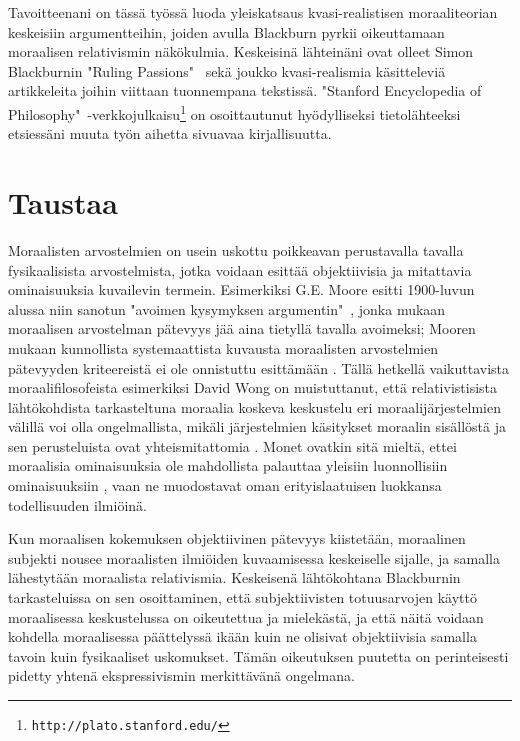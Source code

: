 \documentclass[a4paper,12pt,times,titlepage,finnish]{article}
\begin{document}
Tavoitteenani on tässä työssä luoda yleiskatsaus kvasi-\-realistisen moraaliteorian keskeisiin argumentteihin, joiden avulla Blackburn pyrkii oikeuttamaan moraalisen relativismin näkökulmia. Keskeisinä lähteinäni ovat olleet Simon Blackburnin "Ruling Passions"\  \citep{Blackburn98} sekä joukko kvasi-\-rea\-lis\-mia kä\-sit\-te\-leviä artikkeleita joihin viittaan tuonnempana tekstissä. "Stanford Encyclopedia of Philosophy"\ -verkkojulkaisu\footnote{\texttt{http://plato.stanford.edu/}} on osoittautunut hyödylliseksi tie\-to\-läh\-teek\-si etsiessäni muuta työn aihetta sivuavaa kirjallisuutta.


\section{Taustaa}

Moraalisten arvostelmien on usein uskottu poikkeavan perustavalla tavalla fysikaalisista arvostelmista, jotka voidaan esittää objektiivisia ja mitattavia ominaisuuksia kuvailevin termein. Esimerkiksi G.E. Moore esitti 1900-luvun alussa niin sanotun "avoimen kysymyksen argumentin"\ \citep[15]{Moore03}, jonka mukaan moraalisen arvostelman pätevyys jää aina tietyllä tavalla avoimeksi; Mooren mukaan kunnollista systemaattista kuvausta moraalisten arvostelmien pätevyyden kriteereistä ei ole onnistuttu esittämään \citep[luku 2]{NonNaturalism08}. Tällä hetkellä vaikuttavista moraalifilosofeista esimerkiksi David Wong on muistuttanut, että relativistisista läh\-tö\-koh\-dis\-ta tarkasteltuna moraalia koskeva keskustelu eri moraalijärjestelmien välillä voi olla ongelmallista, mikäli järjestelmien käsitykset moraalin sisällöstä ja sen perusteluista ovat yhteismitattomia \citep[ks. esim.][luku 1]{Wong84}. Monet ovatkin sitä mieltä, ettei moraalisia ominaisuuksia ole mahdollista palauttaa yleisiin luonnollisiin ominaisuuksiin \citep[kappale 3.1]{cognitivismSE}, vaan ne muodostavat oman erityislaatuisen luokkansa todellisuuden ilmiöinä. 

Kun moraalisen kokemuksen objektiivinen pätevyys kiistetään, moraalinen subjekti nousee moraalisten ilmiöiden kuvaamisessa keskeiselle sijalle, ja samalla lä\-hes\-ty\-tään moraalista relativismia. Keskeisenä lähtökohtana Blackburnin tarkasteluissa on sen osoittaminen, että subjektiivisten totuusarvojen käyttö moraalisessa keskustelussa on oikeutettua ja mielekästä, ja että näitä voidaan kohdella moraalisessa päättelyssä ikään kuin ne olisivat objektiivisia samalla tavoin kuin fysikaaliset uskomukset. Tä\-män oikeutuksen puutetta on perinteisesti pidetty yhtenä ekspressivismin mer\-kit\-tä\-vä\-nä ongelmana.
\end{document}
